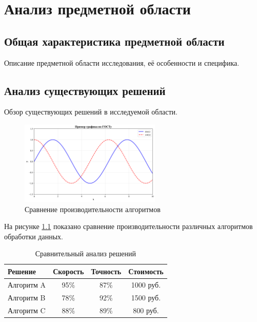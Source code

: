 \chapter{Анализ предметной области}

\section{Общая характеристика предметной области}

Описание предметной области исследования, её особенности и специфика.

\section{Анализ существующих решений}

Обзор существующих решений в исследуемой области.

\begin{figure}[H]
\centering
\includegraphics[width=0.6\textwidth]{images/example_plot.png}
\caption{Сравнение производительности алгоритмов}
\label{fig:algorithm_comparison}
\end{figure}

На рисунке \ref{fig:algorithm_comparison} показано сравнение производительности различных алгоритмов обработки данных.

\begin{table}[H]
\centering
\caption{Сравнительный анализ решений}
\label{tab:solutions_comparison}
\begin{tabular}{|l|c|c|c|}
\hline
\textbf{Решение} & \textbf{Скорость} & \textbf{Точность} & \textbf{Стоимость} \\
\hline
Алгоритм A & 95\% & 87\% & 1000 руб. \\
Алгоритм B & 78\% & 92\% & 1500 руб. \\
Алгоритм C & 88\% & 89\% & 800 руб. \\
\hline
\end{tabular}
\end{table}

